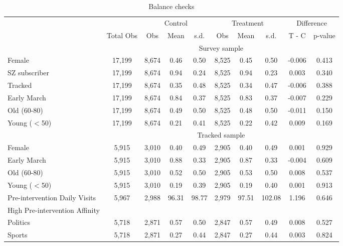  \begin{table}[H]
 \centering 
 \caption{Balance checks} 
 \label{tab:balance} 
 \begin{adjustbox}{max width=\textwidth} 
\begin{tabular}{lccccccccc} 
 \toprule
 & & \multicolumn{3}{c}{Control} & \multicolumn{3}{c}{Treatment} & \multicolumn{2}{c}{Difference} \\
 \cmidrule(lr){3-5} \cmidrule(lr){6-8} \cmidrule(lr){9-10} 
 & Total Obs & Obs & Mean & s.d. & Obs & Mean & s.d. & T - C & p-value \\
 \midrule
 & \multicolumn{9}{c}{Survey sample}\\ 
Female &   17,199 &    8,674 &  0.46 &  0.50 &    8,525 &  0.45 &  0.50 & -0.006 & 0.413 \\
SZ subscriber &   17,199 &    8,674 &  0.94 &  0.24 &    8,525 &  0.94 &  0.23 & 0.003 & 0.340 \\
Tracked &   17,199 &    8,674 &  0.35 &  0.48 &    8,525 &  0.34 &  0.47 & -0.006 & 0.388 \\
Early March &   17,199 &    8,674 &  0.84 &  0.37 &    8,525 &  0.83 &  0.37 & -0.007 & 0.229 \\
Old (60-80) &   17,199 &    8,674 &  0.49 &  0.50 &    8,525 &  0.48 &  0.50 & -0.011 & 0.150 \\
Young ($<$50) &   17,199 &    8,674 &  0.21 &  0.41 &    8,525 &  0.22 &  0.42 & 0.009 & 0.169 \\
 \cmidrule(lr){2-10} 
 & \multicolumn{9}{c}{Tracked sample}\\ 
Female &    5,915 &    3,010 &  0.40 &  0.49 &    2,905 &  0.40 &  0.49 & 0.001 & 0.929 \\
Early March &    5,915 &    3,010 &  0.88 &  0.33 &    2,905 &  0.87 &  0.33 & -0.004 & 0.609 \\
Old (60-80) &    5,915 &    3,010 &  0.52 &  0.50 &    2,905 &  0.53 &  0.50 & 0.008 & 0.537 \\
Young ($<$50) &    5,915 &    3,010 &  0.19 &  0.39 &    2,905 &  0.19 &  0.40 & 0.001 & 0.913 \\
Pre-intervention Daily Visits &    5,967 &    2,988 & 96.31 & 98.77 &    2,979 & 97.51 & 102.08 & 1.196 & 0.646 \\
High Pre-intervention Affinity & & & & & & & & & \\
\hspace{2mm} Politics &    5,718 &    2,871 &  0.57 &  0.50 &    2,847 &  0.57 &  0.49 & 0.008 & 0.527 \\
\hspace{2mm} Sports &    5,718 &    2,871 &  0.27 &  0.44 &    2,847 &  0.27 &  0.44 & 0.003 & 0.824 \\

\end{tabular}
\end{adjustbox}
\end{table}
